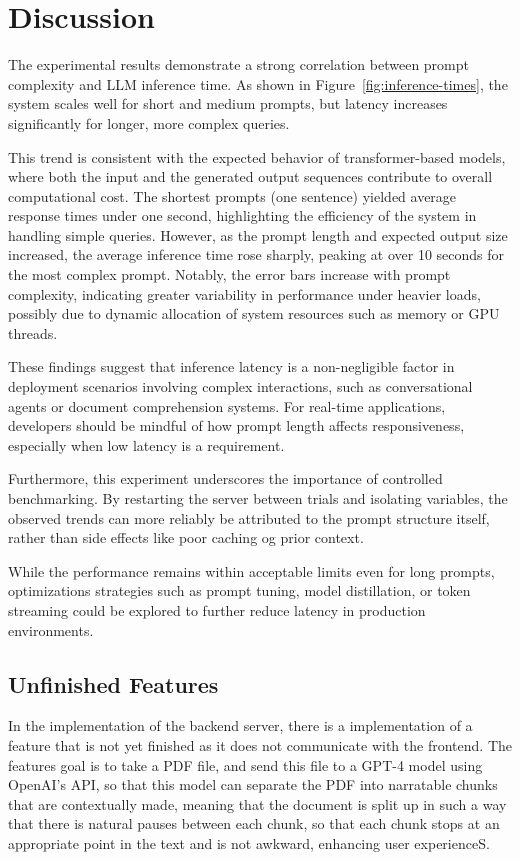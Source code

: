 \documentclass[twocolumn]{article}
\begin{document}
\section{Discussion}
The experimental results demonstrate a strong correlation between prompt complexity and LLM inference time. As shown in Figure~\ref{fig:inference-times}, the system scales well for short and medium prompts, but latency increases significantly for longer, more complex queries.

This trend is consistent with the expected behavior of transformer-based models, where both the input and the generated output sequences contribute to overall computational cost. The shortest prompts (one sentence) yielded average response times under one second, highlighting the efficiency of the system in handling simple queries. However, as the prompt length and expected output size increased, the average inference time rose sharply, peaking at over 10 seconds for the most complex prompt. Notably, the error bars increase with prompt complexity, indicating greater variability in performance under heavier loads, possibly due to dynamic allocation of system resources such as memory or GPU threads.

These findings suggest that inference latency is a non-negligible factor in deployment scenarios involving complex interactions, such as conversational agents or document comprehension systems. For real-time applications, developers should be mindful of how prompt length affects responsiveness, especially when low latency is a requirement.

Furthermore, this experiment underscores the importance of controlled benchmarking. By restarting the server between trials and isolating variables, the observed trends can more reliably be attributed to the prompt structure itself, rather than side effects like poor caching og prior context.

While the performance remains within acceptable limits even for long prompts, optimizations strategies such as prompt tuning, model distillation, or token streaming could be explored to further reduce latency in production environments.

\subsection{Unfinished Features}
In the implementation of the backend server, there is a implementation of a feature that is not yet finished as it does not communicate with the frontend. The features goal is to take a PDF file, and send this file to a GPT-4 model using OpenAI's API, so that this model can separate the PDF into narratable chunks that are contextually made, meaning that the document is split up in such a way that there is natural pauses between each chunk, so that each chunk stops at an appropriate point in the text and is not awkward, enhancing user experienceS.
\end{document}
